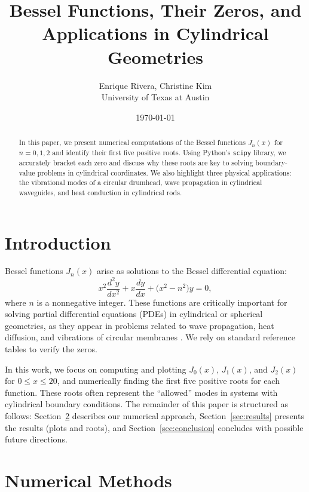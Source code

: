 \documentclass{article}
\title{Bessel Functions, Their Zeros, and Applications in Cylindrical Geometries}
\author{Enrique Rivera, Christine Kim \\ University of Texas at Austin}
\date{\today}
\begin{document}
\maketitle

\begin{abstract}
In this paper, we present numerical computations of the Bessel functions 
$J_n(x)$ for $n=0, 1, 2$ and identify their first five positive roots. Using 
Python's \texttt{scipy} library, we accurately bracket each zero and discuss 
why these roots are key to solving boundary-value problems in cylindrical 
coordinates. We also highlight three physical applications: the vibrational 
modes of a circular drumhead, wave propagation in cylindrical waveguides, 
and heat conduction in cylindrical rods.
\end{abstract}


\section{Introduction} \label{sec:intro}

Bessel functions $J_n(x)$ arise as solutions to the Bessel differential equation:
\begin{equation}
x^2 \frac{d^2 y}{dx^2} + x \frac{dy}{dx} + \bigl(x^2 - n^2\bigr) y = 0,
\end{equation}
where $n$ is a nonnegative integer. These functions are critically important 
for solving partial differential equations (PDEs) in cylindrical or spherical 
geometries, as they appear in problems related to wave propagation, heat 
diffusion, and vibrations of circular membranes 
\citep{Boas2006,Arfken2013}. 
We rely on standard reference tables \citep{Olver2010} to verify the zeros.

In this work, we focus on computing and plotting $J_0(x)$, $J_1(x)$, and 
$J_2(x)$ for $0 \le x \le 20$, and numerically finding the first five positive 
roots for each function. These roots often represent the ``allowed'' modes 
in systems with cylindrical boundary conditions. The remainder of this paper 
is structured as follows: Section~\ref{sec:methods} describes our numerical 
approach, Section~\ref{sec:results} presents the results (plots and roots), 
and Section~\ref{sec:conclusion} concludes with possible future directions.

\section{Numerical Methods} \label{sec:methods}
\end{document}
